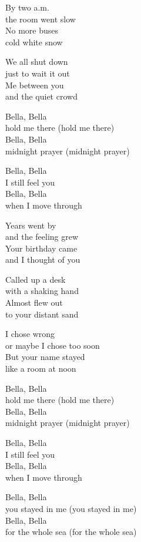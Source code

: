 \begin{lyrics}
By two a.m.\\
the room went slow\\
No more buses\\
cold white snow

We all shut down\\
just to wait it out\\
Me between you\\
and the quiet crowd

Bella, Bella\\
hold me there (hold me there)\\
Bella, Bella\\
midnight prayer (midnight prayer)

Bella, Bella\\
I still feel you\\
Bella, Bella\\
when I move through

Years went by\\
and the feeling grew\\
Your birthday came\\
and I thought of you

Called up a desk\\
with a shaking hand\\
Almost flew out\\
to your distant sand

I chose wrong\\
or maybe I chose too soon\\
But your name stayed\\
like a room at noon

Bella, Bella\\
hold me there (hold me there)\\
Bella, Bella\\
midnight prayer (midnight prayer)

Bella, Bella\\
I still feel you\\
Bella, Bella\\
when I move through

Bella, Bella\\
you stayed in me (you stayed in me)\\
Bella, Bella\\
for the whole sea (for the whole sea)

\end{lyrics}

